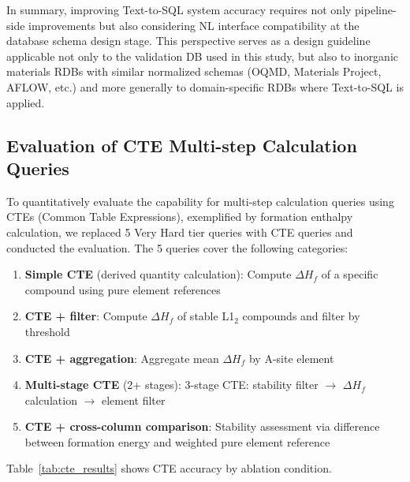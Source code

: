 \documentclass{npj-compt.mater}
\begin{document}
In summary, improving Text-to-SQL system accuracy requires not
only pipeline-side improvements but also considering NL interface
compatibility at the database schema design stage.
This perspective serves as a design guideline applicable not only
to the validation DB used in this study, but also to inorganic
materials RDBs with similar normalized schemas
(OQMD, Materials Project, AFLOW, etc.) and more generally to
domain-specific RDBs where Text-to-SQL is applied.

\subsection{Evaluation of CTE Multi-step Calculation Queries}
\label{sec:cte_evaluation}

To quantitatively evaluate the capability for multi-step
calculation queries using CTEs (Common Table Expressions),
exemplified by formation enthalpy calculation, we replaced 5 Very
Hard tier queries with CTE queries and conducted the evaluation.
The 5 queries cover the following categories:

\begin{enumerate}[nosep]
  \item \textbf{Simple CTE} (derived quantity calculation):
    Compute $\Delta H_f$ of a specific compound using pure element
    references
  \item \textbf{CTE + filter}:
    Compute $\Delta H_f$ of stable L1$_2$ compounds and filter by
    threshold
  \item \textbf{CTE + aggregation}:
    Aggregate mean $\Delta H_f$ by A-site element
  \item \textbf{Multi-stage CTE} (2+ stages):
    3-stage CTE: stability filter $\to$ $\Delta H_f$ calculation
    $\to$ element filter
  \item \textbf{CTE + cross-column comparison}:
    Stability assessment via difference between formation energy
    and weighted pure element reference
\end{enumerate}

Table~\ref{tab:cte_results} shows CTE accuracy by ablation
condition.
\end{document}
